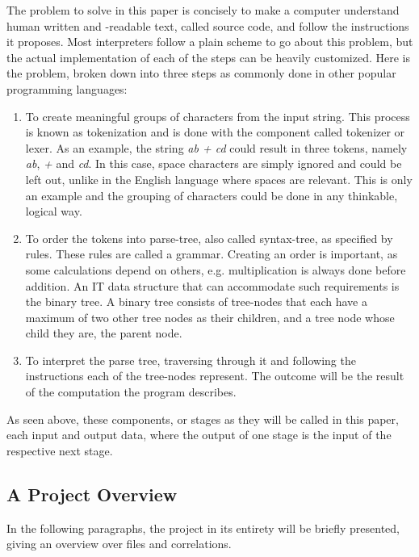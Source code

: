 \documentclass[12pt,a4paper]{article}
\newcommand{\pagelabel}[1]{\phantomsection\label{#1}}
\begin{document}
The problem to solve in this paper is concisely to make a computer understand
human written and -readable text, called source code, and follow the instructions
it proposes.
Most interpreters follow a plain scheme to go about this problem, but the
actual implementation of each of the steps can be heavily customized.
Here is the problem, broken down into three steps as commonly done in other
popular programming languages:
\begin{enumerate}\pagelabel{simple_interpreter}
    \item To create meaningful groups of characters from the input string. This
        process is known as tokenization and is done with the component called
        tokenizer or lexer. As an example, the string \emph{ab + cd} could result
        in three tokens, namely \emph{ab}, \emph{+} and \emph{cd}. In this case, space characters
        are simply ignored and could be left out, unlike in the English language where spaces are relevant. 
        This is only an example and the grouping of characters could be done 
        in any thinkable, logical way.
    \item To order the tokens into parse-tree, also called syntax-tree, as
        specified by rules. These rules are called a grammar.
        Creating an order is important, as some calculations depend on others, e.g. multiplication
        is always done before addition. An IT data structure that can accommodate
        such requirements is the binary tree. A binary tree consists of tree-nodes
        that each have a maximum of two other tree nodes as their children, and
        a tree node whose child they are, the parent node.
    \item To interpret the parse tree, traversing through it and following the
        instructions each of the tree-nodes represent. The outcome
        will be the result of the computation the program describes.
\end{enumerate}

As seen above, these components, or stages as they will be called in this paper,
each input and output data, where the output of one stage is the input of the
respective next stage.

\subsection{A Project Overview}
In the following paragraphs, the project in its entirety will be briefly
presented, giving an overview over files and correlations.
\end{document}
